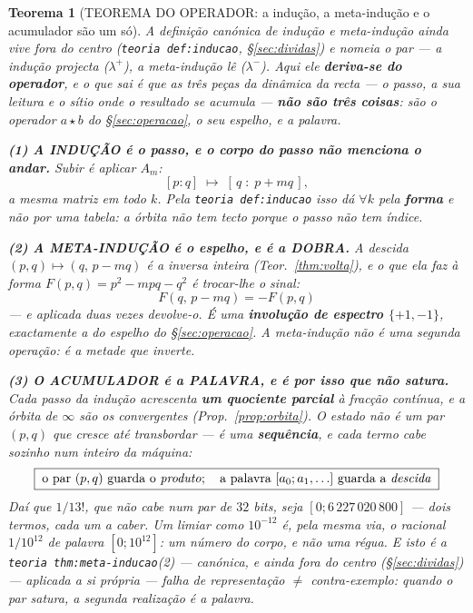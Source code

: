 \documentclass[11pt,a4paper]{article}
\newtheorem{teorema}{Teorema}
\newcommand{\code}[1]{\texttt{\small #1}}
\begin{document}
\begin{teorema}[TEOREMA DO OPERADOR: a indução, a meta-indução e o acumulador são um
só]\label{thm:operador}
A definição canónica de indução e meta-indução ainda vive fora do centro (\code{teoria def:inducao}, \S\ref{sec:dividas}) e nomeia o par --- a indução projecta
($\lambda^{+}$), a meta-indução lê ($\lambda^{-}$). Aqui ele \textbf{deriva-se do
operador}, e o que sai é que as três peças da dinâmica da recta --- o passo, a sua leitura
e o sítio onde o resultado se acumula --- \textbf{não são três coisas}: são o operador
$a\star b$ do \S\ref{sec:operacao}, o seu espelho, e a palavra.

\textbf{(1) A INDUÇÃO é o passo, e o corpo do passo não menciona o andar.} Subir é aplicar
$A_m$:
\[
[p:q]\;\longmapsto\;[\,q\;:\;p+mq\,],
\]
a mesma matriz em todo $k$. Pela \code{teoria def:inducao} isso dá $\forall k$ pela
\textbf{forma} e não por uma tabela: \emph{a órbita não tem tecto porque o passo não tem
índice}.

\textbf{(2) A META-INDUÇÃO é o espelho, e é a DOBRA.} A descida $(p,q)\mapsto(q,\,p-mq)$ é
a inversa inteira (Teor.~\ref{thm:volta}), e o que ela faz à forma
$F(p,q)=p^{2}-mpq-q^{2}$ é \emph{trocar-lhe o sinal}:
\[
\boxed{\;F(q,\,p-mq)=-F(p,q)\;}
\]
--- e aplicada duas vezes devolve-o. É uma \textbf{involução de espectro $\{+1,-1\}$},
exactamente a do espelho do \S\ref{sec:operacao}. \emph{A meta-indução não é uma segunda
operação: é a metade que inverte.}

\textbf{(3) O ACUMULADOR é a PALAVRA, e é por isso que não satura.} Cada passo da indução
acrescenta \textbf{um quociente parcial} à fracção contínua, e a órbita de $\infty$ são os
convergentes (Prop.~\ref{prop:orbita}). O estado não é um par $(p,q)$ que cresce até
transbordar --- é uma \textbf{sequência}, e cada termo cabe sozinho num inteiro da máquina:
\[
\boxed{\;\text{o par }(p,q)\text{ guarda o \emph{produto}};\quad
        \text{a palavra }[a_0;a_1,\ldots]\text{ guarda a \emph{descida}}\;}
\]
Daí que $1/13!$, que não cabe num par de $32$ bits, seja $[0;6\,227\,020\,800]$ --- dois
termos, cada um a caber. \emph{Um limiar como $10^{-12}$ é, pela mesma via, o racional
$1/10^{12}$ de palavra $[0;10^{12}]$: um número do corpo, e não uma régua.} E isto é a
\code{teoria thm:meta-inducao}(2) --- canónica, e ainda fora do centro (\S\ref{sec:dividas}) --- aplicada a si própria --- \emph{falha de representação
$\neq$ contra-exemplo}: quando o par satura, a segunda realização é a palavra.


\end{teorema}
\end{document}
